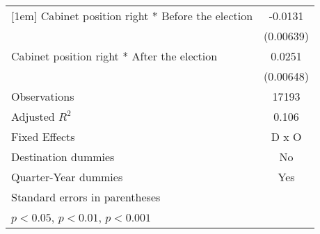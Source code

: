 \begin{table}[htbp]
\begin{tabular}{l*{1}{c}}
[1em]
Cabinet position right * Before the election&     -0.0131\sym{*}  \\
                    &   (0.00639)         \\
[1em]
Cabinet position right * After the election&      0.0251\sym{***}\\
                    &   (0.00648)         \\
\hline
Observations        &       17193         \\
Adjusted \(R^{2}\)  &       0.106         \\
Fixed Effects       &       D x O         \\
Destination dummies &          No         \\
Quarter-Year dummies&         Yes         \\
\hline\hline
\multicolumn{2}{l}{\footnotesize Standard errors in parentheses}\\
\multicolumn{2}{l}{\footnotesize \sym{*} \(p<0.05\), \sym{**} \(p<0.01\), \sym{***} \(p<0.001\)}\\
\end{tabular}
\end{table}
